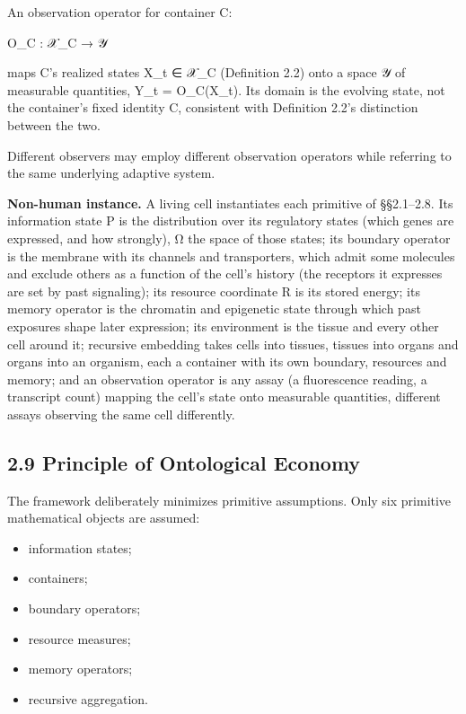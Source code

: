 \documentclass[
]{article}
\begin{document}
An observation operator for container C:

O\_C : 𝒳\_C → 𝒴

maps C's realized states X\_t ∈ 𝒳\_C (Definition 2.2) onto a space 𝒴 of
measurable quantities, Y\_t = O\_C(X\_t). Its domain is the evolving
state, not the container's fixed identity C, consistent with Definition
2.2's distinction between the two.

Different observers may employ different observation operators while
referring to the same underlying adaptive system.

\textbf{Non-human instance.} A living cell instantiates each primitive
of §§2.1--2.8. Its information state P is the distribution over its
regulatory states (which genes are expressed, and how strongly), Ω the
space of those states; its boundary operator is the membrane with its
channels and transporters, which admit some molecules and exclude others
as a function of the cell's history (the receptors it expresses are set
by past signaling); its resource coordinate R is its stored energy; its
memory operator is the chromatin and epigenetic state through which past
exposures shape later expression; its environment is the tissue and
every other cell around it; recursive embedding takes cells into
tissues, tissues into organs and organs into an organism, each a
container with its own boundary, resources and memory; and an
observation operator is any assay (a fluorescence reading, a transcript
count) mapping the cell's state onto measurable quantities, different
assays observing the same cell differently.

\hypertarget{principle-of-ontological-economy}{%
\subsection{2.9 Principle of Ontological
Economy}\label{principle-of-ontological-economy}}

The framework deliberately minimizes primitive assumptions. Only six
primitive mathematical objects are assumed:

\begin{itemize}
\item
  information states;
\item
  containers;
\item
  boundary operators;
\item
  resource measures;
\item
  memory operators;
\item
  recursive aggregation.
\end{itemize}
\end{document}
